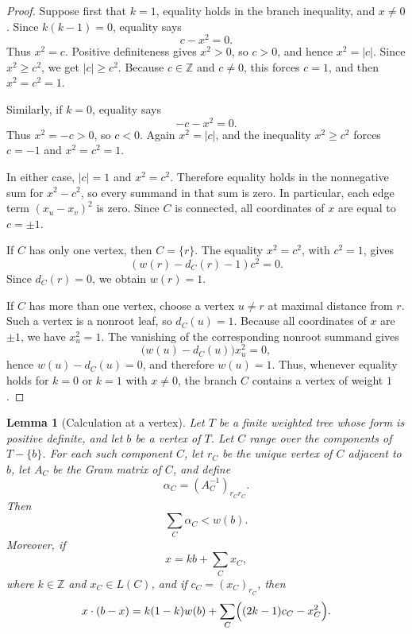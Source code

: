 \documentclass[12pt]{article}
\newcommand{\Z}{\mathbb{Z}}
\newtheorem{lemma}[theorem]{Lemma}
\begin{document}
\begin{proof}
Suppose first that \(k=1\), equality holds in the branch inequality, and \(x\ne 0\). Since \(k(k-1)=0\), equality says
\[
c-x^2=0.
\]
Thus \(x^2=c\). Positive definiteness gives \(x^2>0\), so \(c>0\), and hence \(x^2=|c|\). Since \(x^2\ge c^2\), we get \(|c|\ge c^2\). Because \(c\in\Z\) and \(c\ne 0\), this forces \(c=1\), and then \(x^2=c^2=1\).

Similarly, if \(k=0\), equality says
\[
-c-x^2=0.
\]
Thus \(x^2=-c>0\), so \(c<0\). Again \(x^2=|c|\), and the inequality \(x^2\ge c^2\) forces \(c=-1\) and \(x^2=c^2=1\).

In either case, \(|c|=1\) and \(x^2=c^2\). Therefore equality holds in the nonnegative sum for \(x^2-c^2\), so every summand in that sum is zero. In particular, each edge term \((x_u-x_v)^2\) is zero. Since \(C\) is connected, all coordinates of \(x\) are equal to \(c=\pm 1\).

If \(C\) has only one vertex, then \(C=\{r\}\). The equality \(x^2=c^2\), with \(c^2=1\), gives
\[
(w(r)-d_C(r)-1)c^2=0.
\]
Since \(d_C(r)=0\), we obtain \(w(r)=1\).

If \(C\) has more than one vertex, choose a vertex \(u\ne r\) at maximal distance from \(r\). Such a vertex is a nonroot leaf, so \(d_C(u)=1\). Because all coordinates of \(x\) are \(\pm 1\), we have \(x_u^2=1\). The vanishing of the corresponding nonroot summand gives
\[
\bigl(w(u)-d_C(u)\bigr)x_u^2=0,
\]
hence \(w(u)-d_C(u)=0\), and therefore \(w(u)=1\). Thus, whenever equality holds for \(k=0\) or \(k=1\) with \(x\ne 0\), the branch \(C\) contains a vertex of weight \(1\).
\end{proof}

\begin{lemma}[Calculation at a vertex]\label{lem:bad-vertex}
Let \(T\) be a finite weighted tree whose form is positive definite, and let \(b\) be a vertex of \(T\). Let \(C\) range over the components of \(T-\{b\}\). For each such component \(C\), let \(r_C\) be the unique vertex of \(C\) adjacent to \(b\), let \(A_C\) be the Gram matrix of \(C\), and define
\[
\alpha_C=(A_C^{-1})_{r_Cr_C}.
\]
Then
\[
\sum_C \alpha_C<w(b).
\]
Moreover, if
\[
x=kb+\sum_C x_C,
\]
where \(k\in\Z\) and \(x_C\in L(C)\), and if \(c_C=(x_C)_{r_C}\), then
\[
x\cdot(b-x)
=
k(1-k)w(b)
+
\sum_C\Bigl((2k-1)c_C-x_C^2\Bigr).
\]
\end{lemma}
\end{document}
